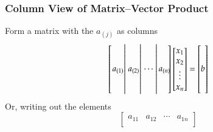 \documentclass[10pt]{beamer}
\begin{document}
\begin{frame}
\frametitle{Column View of Matrix--Vector Product}

Form a matrix with the $a_{(j)}$ as columns
\begin{equation*}
    \begin{bmatrix}\left. \begin{matrix} \\ \\ a_{(1)}  \\ \\ \\ \end{matrix}\right|
                   \left. \begin{matrix} \\ \\ a_{(2)}  \\ \\ \\ \end{matrix}\right|
                   \left. \begin{matrix} \\ \\ {\cdots\ } \\ \\ \\ \end{matrix}\right|
                          \begin{matrix} \\ \\ a_{(n)}  \\ \\ \\ \end{matrix}\negthickspace
    \end{bmatrix}
    \begin{bmatrix} x_1 \\ x_2 \\ \vdots \\ x_n \end{bmatrix}
    =
    \begin{bmatrix}  \\  \\ b \\  \\  \\ \end{bmatrix}
\end{equation*}
Or, writing out the elements
\begin{equation*}
    \begin{bmatrix} a_{11} & a_{12} & \cdots & a_{1n} \\

\end{bmatrix}
\end{equation*}
\end{frame}
\end{document}
